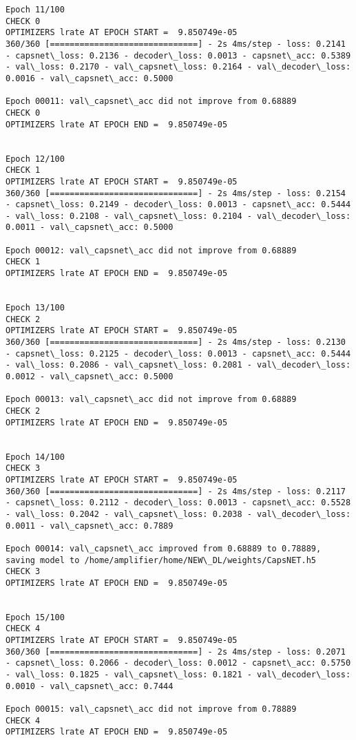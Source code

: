 \documentclass[11pt]{article}
\begin{document}
\begin{Verbatim}[commandchars=\\\{\}]
Epoch 11/100
CHECK 0
OPTIMIZERS lrate AT EPOCH START =  9.850749e-05
360/360 [==============================] - 2s 4ms/step - loss: 0.2141 - capsnet\_loss: 0.2136 - decoder\_loss: 0.0013 - capsnet\_acc: 0.5389 - val\_loss: 0.2170 - val\_capsnet\_loss: 0.2164 - val\_decoder\_loss: 0.0016 - val\_capsnet\_acc: 0.5000

Epoch 00011: val\_capsnet\_acc did not improve from 0.68889
CHECK 0
OPTIMIZERS lrate AT EPOCH END =  9.850749e-05 


Epoch 12/100
CHECK 1
OPTIMIZERS lrate AT EPOCH START =  9.850749e-05
360/360 [==============================] - 2s 4ms/step - loss: 0.2154 - capsnet\_loss: 0.2149 - decoder\_loss: 0.0013 - capsnet\_acc: 0.5444 - val\_loss: 0.2108 - val\_capsnet\_loss: 0.2104 - val\_decoder\_loss: 0.0011 - val\_capsnet\_acc: 0.5000

Epoch 00012: val\_capsnet\_acc did not improve from 0.68889
CHECK 1
OPTIMIZERS lrate AT EPOCH END =  9.850749e-05 


Epoch 13/100
CHECK 2
OPTIMIZERS lrate AT EPOCH START =  9.850749e-05
360/360 [==============================] - 2s 4ms/step - loss: 0.2130 - capsnet\_loss: 0.2125 - decoder\_loss: 0.0013 - capsnet\_acc: 0.5444 - val\_loss: 0.2086 - val\_capsnet\_loss: 0.2081 - val\_decoder\_loss: 0.0012 - val\_capsnet\_acc: 0.5000

Epoch 00013: val\_capsnet\_acc did not improve from 0.68889
CHECK 2
OPTIMIZERS lrate AT EPOCH END =  9.850749e-05 


Epoch 14/100
CHECK 3
OPTIMIZERS lrate AT EPOCH START =  9.850749e-05
360/360 [==============================] - 2s 4ms/step - loss: 0.2117 - capsnet\_loss: 0.2112 - decoder\_loss: 0.0013 - capsnet\_acc: 0.5528 - val\_loss: 0.2042 - val\_capsnet\_loss: 0.2038 - val\_decoder\_loss: 0.0011 - val\_capsnet\_acc: 0.7889

Epoch 00014: val\_capsnet\_acc improved from 0.68889 to 0.78889, saving model to /home/amplifier/home/NEW\_DL/weights/CapsNET.h5
CHECK 3
OPTIMIZERS lrate AT EPOCH END =  9.850749e-05 


Epoch 15/100
CHECK 4
OPTIMIZERS lrate AT EPOCH START =  9.850749e-05
360/360 [==============================] - 2s 4ms/step - loss: 0.2071 - capsnet\_loss: 0.2066 - decoder\_loss: 0.0012 - capsnet\_acc: 0.5750 - val\_loss: 0.1825 - val\_capsnet\_loss: 0.1821 - val\_decoder\_loss: 0.0010 - val\_capsnet\_acc: 0.7444

Epoch 00015: val\_capsnet\_acc did not improve from 0.78889
CHECK 4
OPTIMIZERS lrate AT EPOCH END =  9.850749e-05 



\end{Verbatim}
\end{document}
